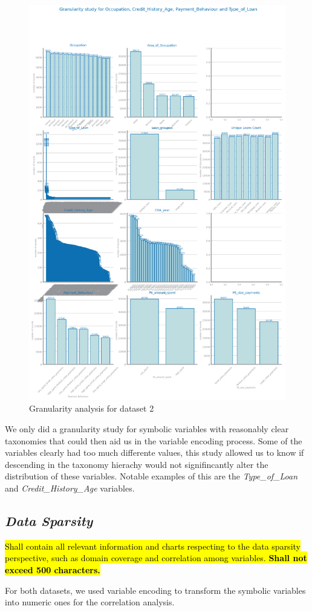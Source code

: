 \documentclass[10pt]{extarticle}
\newcommand{\ctext}[3][RGB]{%
  \begingroup
  \definecolor{hlcolor}{#1}{#2}\sethlcolor{hlcolor}%
  \hl{#3}%
  \endgroup
}
\begin{document}
\begin{figure}[H]
\centering\includegraphics[scale=0.95]{images/dataset2/data_profiling/Credit_Score_granularity.png}
\caption{Granularity analysis for dataset 2}
\end{figure}
We only did a granularity study for symbolic variables with reasonably clear taxonomies that could then aid us in the variable
encoding process. Some of the variables clearly had too much differente values, this study allowed us to know if descending in the
taxonomy hierachy would not signifincantly alter the distribution of these variables. Notable examples of this are the 
\textit{Type\_of\_Loan} and \textit{Credit\_History\_Age} variables.

\subsection*{\textit{Data Sparsity}}
\ctext[RGB]{190,190,190}{Shall contain all relevant information and charts respecting to the data sparsity perspective, such as domain coverage and correlation among variables.  \textbf{Shall not exceed 500 characters.}}
For both datasets, we used variable encoding to transform the symbolic variables into numeric ones for the correlation analysis.
\end{document}
